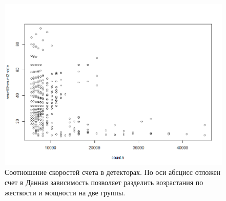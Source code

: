 \begin{figure}
	\centering
	\includegraphics[width=0.7\linewidth]{images/Flash/Rplot11}
	\caption{Соотношение скоростей счета в детекторах. По оси абсцисс отложен счет в Данная зависимость позволяет разделить возрастания по жесткости и мощности на две группы.}
	\label{fig:rplot11}
\end{figure}

